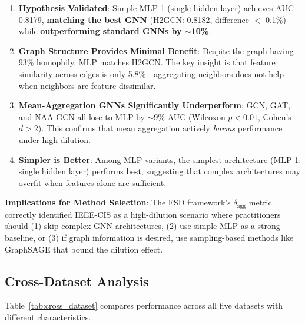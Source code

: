 \begin{enumerate}
\item \textbf{Hypothesis Validated}: Simple MLP-1 (single hidden layer) achieves AUC 0.8179, \textbf{matching the best GNN} (H2GCN: 0.8182, difference $<$ 0.1\%) while \textbf{outperforming standard GNNs by $\sim$10\%}.

\item \textbf{Graph Structure Provides Minimal Benefit}: Despite the graph having 93\% homophily, MLP matches H2GCN. The key insight is that feature similarity across edges is only 5.8\%---aggregating neighbors does not help when neighbors are feature-dissimilar.

\item \textbf{Mean-Aggregation GNNs Significantly Underperform}: GCN, GAT, and NAA-GCN all lose to MLP by $\sim$9\% AUC (Wilcoxon $p < 0.01$, Cohen's $d > 2$). This confirms that mean aggregation actively \textit{harms} performance under high dilution.

\item \textbf{Simpler is Better}: Among MLP variants, the simplest architecture (MLP-1: single hidden layer) performs best, suggesting that complex architectures may overfit when features alone are sufficient.
\end{enumerate}

\textbf{Implications for Method Selection}: The FSD framework's $\delta_{\text{agg}}$ metric correctly identified IEEE-CIS as a high-dilution scenario where practitioners should (1) skip complex GNN architectures, (2) use simple MLP as a strong baseline, or (3) if graph information is desired, use sampling-based methods like GraphSAGE that bound the dilution effect.

\subsection{Cross-Dataset Analysis}
\label{sec:cross_dataset}

Table~\ref{tab:cross_dataset} compares performance across all five datasets with different characteristics.

